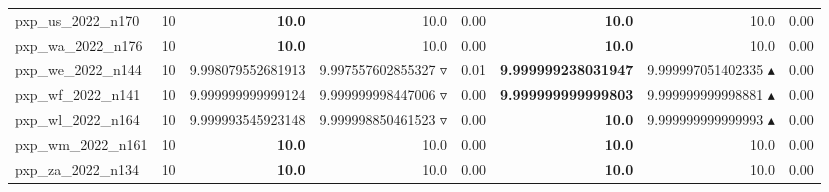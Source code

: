\begin{table}[]
{\begin{tabular}{ll@{\hspace{1.2cm}}rrr@{\hspace{1.2cm}}rrr}
pxp_us_2022_n170 & 10 & \textbf{10.0} & 10.0 \phantom{$\blacktriangle$} & 0.00 & \textbf{10.0} & 10.0 \phantom{$\blacktriangle$} & 0.00 \\
pxp_wa_2022_n176 & 10 & \textbf{10.0} & 10.0 \phantom{$\blacktriangle$} & 0.00 & \textbf{10.0} & 10.0 \phantom{$\blacktriangle$} & 0.00 \\
pxp_we_2022_n144 & 10 & 9.998079552681913 & 9.997557602855327 $\triangledown$ & 0.01 & \textbf{9.999999238031947} & 9.999997051402335 $\blacktriangle$ & 0.00 \\
pxp_wf_2022_n141 & 10 & 9.999999999999124 & 9.999999998447006 $\triangledown$ & 0.00 & \textbf{9.999999999999803} & 9.999999999998881 $\blacktriangle$ & 0.00 \\
pxp_wl_2022_n164 & 10 & 9.999993545923148 & 9.999998850461523 $\triangledown$ & 0.00 & \textbf{10.0} & 9.999999999999993 $\blacktriangle$ & 0.00 \\
pxp_wm_2022_n161 & 10 & \textbf{10.0} & 10.0 \phantom{$\blacktriangle$} & 0.00 & \textbf{10.0} & 10.0 \phantom{$\blacktriangle$} & 0.00 \\
pxp_za_2022_n134 & 10 & \textbf{10.0} & 10.0 \phantom{$\blacktriangle$} & 0.00 & \textbf{10.0} & 10.0 \phantom{$\blacktriangle$} & 0.00 \\
\bottomrule
    \end{tabular}
    }
\end{table}
